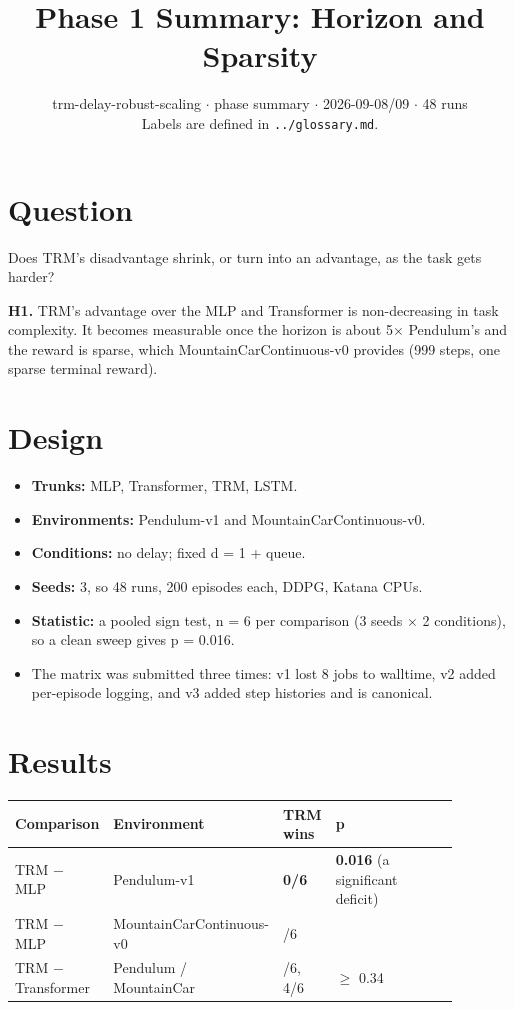 \documentclass[11pt]{article}
\title{Phase 1 Summary: Horizon and Sparsity}
\author{}
\date{trm-delay-robust-scaling $\cdot$ phase summary $\cdot$ 2026-09-08/09 $\cdot$ 48 runs\\[2pt]Labels are defined in \texttt{.\allowbreak{}.\allowbreak{}/\allowbreak{}glossary.\allowbreak{}md}.}
\begin{document}
\maketitle
\section*{Question}



Does TRM's disadvantage shrink, or turn into an advantage, as the task gets harder?



\textbf{H1.} TRM's advantage over the MLP and Transformer is non-decreasing in task complexity. It becomes measurable once the horizon is about 5$\times$ Pendulum's and the reward is sparse, which MountainCarContinuous-v0 provides (999 steps, one sparse terminal reward).



\section*{Design}



\begin{itemize}
\item \textbf{Trunks:} MLP, Transformer, TRM, LSTM.
\item \textbf{Environments:} Pendulum-v1 and MountainCarContinuous-v0.
\item \textbf{Conditions:} no delay; fixed d = 1 + queue.
\item \textbf{Seeds:} 3, so 48 runs, 200 episodes each, DDPG, Katana CPUs.
\item \textbf{Statistic:} a pooled sign test, n = 6 per comparison (3 seeds $\times$ 2 conditions), so a clean sweep gives p = 0.016.
\item The matrix was submitted three times: v1 lost 8 jobs to walltime, v2 added per-episode logging, and v3 added step histories and is canonical.
\end{itemize}



\section*{Results}



\begin{center}\small\begin{tabular}{>{\raggedright\arraybackslash}p{0.190\linewidth}>{\raggedright\arraybackslash}p{0.276\linewidth}>{\raggedleft\arraybackslash}p{0.089\linewidth}>{\raggedleft\arraybackslash}p{0.323\linewidth}}
\toprule
Comparison & Environment & TRM wins & p \\
\midrule
TRM $-$ MLP & Pendulum-v1 & \textbf{0/6} & \textbf{0.016} (a significant deficit) \\
TRM $-$ MLP & MountainCarContinuous-v0 & 3/6 & 0.66 \\
TRM $-$ Transformer & Pendulum / MountainCar & 3/6, 4/6 & $\geq$ 0.34 \\
\bottomrule
\end{tabular}\end{center}
\end{document}
